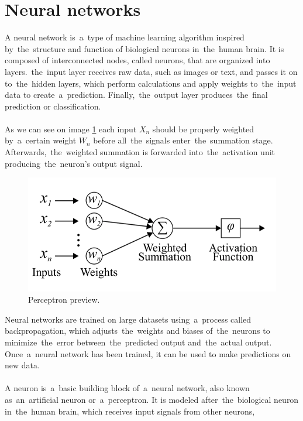 \section{Neural networks} \label{sec:nn}
A neural network is~a~type of machine learning algorithm inspired by~the~structure and function of biological neurons
in~the~human brain. It is composed of interconnected nodes, called neurons, that are organized into layers.~the~input
layer receives raw data, such as images or text, and passes it on to~the~hidden layers, which perform calculations and
apply weights to~the~input data to create~a~prediction. Finally,~the~output layer produces~the~final prediction
or classification.\\
\\
As we can see on image \ref{fig:perceptron} each input $X_n$ should be properly weighted by~a~certain weight $W_n$ before
all~the~signals enter~the~summation stage. Afterwards,~the~weighted summation is forwarded into~the~activation unit
producing~the~neuron’s output signal.
\begin{center}
    \begin{figure}[!ht]
        \centering
        \includegraphics[width=1\textwidth]{figures/nn}
        \caption{Perceptron preview. \cite{Mourgias-Alexandris:19}}
        \label{fig:perceptron}
    \end{figure}
\end{center}
Neural networks are trained on large datasets using~a~process called backpropagation, which adjusts~the~weights and
biases of~the~neurons to minimize~the~error between~the~predicted output and~the~actual output. Once~a~neural network
has been trained, it can be used to make predictions on new data.\\
\\
A neuron is~a~basic building block of~a~neural network, also known as~an~artificial neuron or~a~perceptron.
It is modeled after~the~biological neuron in~the~human brain, which receives input signals from other neurons,
